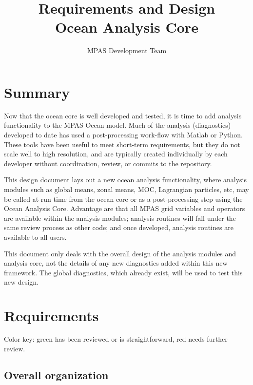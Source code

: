 \documentclass[11pt]{report}
\begin{document}
\title{
Requirements and Design\\
Ocean Analysis Core}
\author{MPAS Development Team}

\maketitle
\tableofcontents


\chapter{Summary}

Now that the ocean core is well developed and tested, it is time to add analysis functionality to the MPAS-Ocean model.  Much of the analysis (diagnostics) developed to date has used a post-processing work-flow with Matlab or Python.  These tools have been useful to meet short-term requirements, but they do not scale well to high resolution, and are typically created individually by each developer without coordination, review, or commits to the repository.

This design document lays out a new ocean analysis functionality, where analysis modules such as global means, zonal means, MOC, Lagrangian particles, etc, may be called at run time from the ocean core or as a post-processing step using the Ocean Analysis Core.  Advantage are that all MPAS grid variables and operators are available within the analysis modules; analysis routines will fall under the same review process as other code; and once developed, analysis routines are available to all users.

This document only deals with the overall design of the analysis modules and analysis core, not the details of any new diagnostics added within this new framework.  The global diagnostics, which already exist, will be used to test this new design. 


\chapter{Requirements}

Color key: {\color{green} green has been reviewed or is straightforward}, {\color{red} red needs further review}.

\section{Overall organization}
\end{document}
